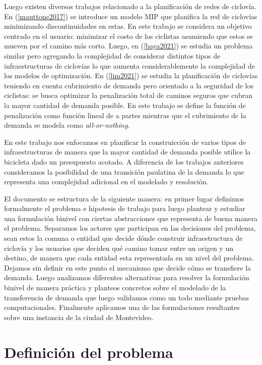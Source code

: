 \documentclass{article}
\begin{document}
  Luego existen diversos trabajos relacionado a la planificación de redes de ciclovía. En (\ref{mauttone2017}) se introduce un modelo MIP que planifica la red de ciclovías minimizando discontinuidades en estas. En este trabajo se considera un objetivo centrado en el usuario: minimizar el costo de los ciclistas asumiendo que estos se mueven por el camino más corto. Luego, en (\ref{baya2021}) se estudia un problema similar pero agregando la complejidad de considerar distintos tipos de infraestructuras de ciclovías lo que aumenta considerablemente la complejidad de los modelos de optimización. En (\ref{lim2021}) se estudia la planificación de ciclovías teniendo en cuenta cubrimiento de demanda pero orientado a la seguridad de los ciclistas: se busca optimizar la penalización total de caminos seguros que cubran la mayor cantidad de demanda posible. En este trabajo se define la función de penalización como función lineal de a partes mientras que el cubrimiento de la demanda se modela como {\it all-or-nothing}.

  En este trabajo nos enfocamos en planificar la construicción de varios tipos de infraestructuras de manera que la mayor cantidad de demanda posible utilice la bicicleta dado un presupuesto acotado. A diferencia de los trabajos anteriores consideramos la posibilidad de una transición paulatina de la demanda lo que representa una complejidad adicional en el modelado y resolución.

  El documento se estructura de la siguiente manera: en primer lugar definimos formalmente el problema e hipotesis de trabajo para luego plantear y estudiar una formulación binivel con ciertas abstracciones que representa de buena manera el problema. Separamos los actores que participan en las decisiones del problema, sean estos la comuna o entidad que decide dónde construir infraestructura de ciclovía y los usuarios que deciden qué camino tomar entre un origen y un destino, de manera que cada entidad esta representada en un nivel del problema. Dejamos sin definir en este punto el mecanismo que decide cómo se transfiere la demanda. Luego analizamos diferentes alternativas para resolver la formulación binivel de manera práctica y planteos concretos sobre el modelado de la transferencia de demanda que luego validamos como un todo mediante pruebas computacionales. Finalmente aplicamos una de las formulaciones resultantes sobre una instancia de la ciudad de Montevideo.

  \section{Definición del problema}
\end{document}
